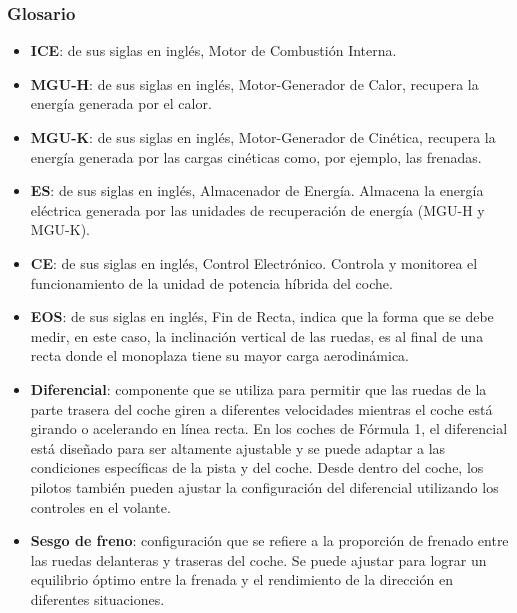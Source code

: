 \documentclass[12pt,a4paper,twoside,spanish]{article}      %
\begin{document}
\subsubsection{Glosario}

\begin{itemize}
    \item \textbf{ICE}: de sus siglas en inglés, Motor de Combustión Interna.
    \item \textbf{MGU-H}: de sus siglas en inglés, Motor-Generador de Calor, recupera la energía generada por el calor.
    \item \textbf{MGU-K}: de sus siglas en inglés, Motor-Generador de Cinética, recupera la energía generada por las cargas cinéticas como, por ejemplo, las frenadas.
    \item \textbf{ES}: de sus siglas en inglés, Almacenador de Energía. Almacena la energía eléctrica generada por las unidades de recuperación de energía (MGU-H y MGU-K). 
    \item \textbf{CE}: de sus siglas en inglés, Control Electrónico. Controla y monitorea el funcionamiento de la unidad de potencia híbrida del coche.
    \item \textbf{EOS}: de sus siglas en inglés, Fin de Recta, indica que la forma que se debe medir, en este caso, la inclinación vertical de las ruedas, es al final de una recta donde el monoplaza tiene su mayor carga aerodinámica.
    \item \textbf{Diferencial}: componente que se utiliza para permitir que las ruedas de la parte trasera del coche giren a diferentes velocidades mientras el coche está girando o acelerando en línea recta. En los coches de Fórmula 1, el diferencial está diseñado para ser altamente ajustable y se puede adaptar a las condiciones específicas de la pista y del coche. Desde dentro del coche, los pilotos también pueden ajustar la configuración del diferencial utilizando los controles en el volante.
    \item \textbf{Sesgo de freno}: configuración que se refiere a la proporción de frenado entre las ruedas delanteras y traseras del coche. Se puede ajustar para lograr un equilibrio óptimo entre la frenada y el rendimiento de la dirección en diferentes situaciones.
\end{itemize}

\end{document}

